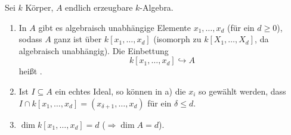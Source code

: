 \begin{Satz}
\label{11}
Sei $k$ K\"orper, $A$ endlich erzeugbare $k$-Algebra.
\begin{enumerate}
\item In $A$ gibt es algebraisch unabh\"angige Elemente $x_1, \ldots, x_d$ (f\"ur ein
$d\geq 0$), sodass $A$ ganz ist \"uber $k[x_1, \ldots, x_d]$ (isomorph zu 
$k[X_1,\ldots,X_d]$, da algebraisch unabh\"angig). Die Einbettung
\[
k[x_1,\ldots,x_d]\hookrightarrow A
\]
heißt .
\item Ist $I\subseteq A$ ein echtes Ideal, so k\"onnen in a) die $x_i$ so
gew\"ahlt werden, dass $I\cap k[x_1, \ldots, x_d]=(x_{\delta+1},\ldots,x_d)$ f\"ur ein
$\delta \leq d$.
\item $\dim{k[x_1,\ldots,x_d]}=d$ ($\Rightarrow \dim{A} = d$).
\end{enumerate}
\end{Satz}

